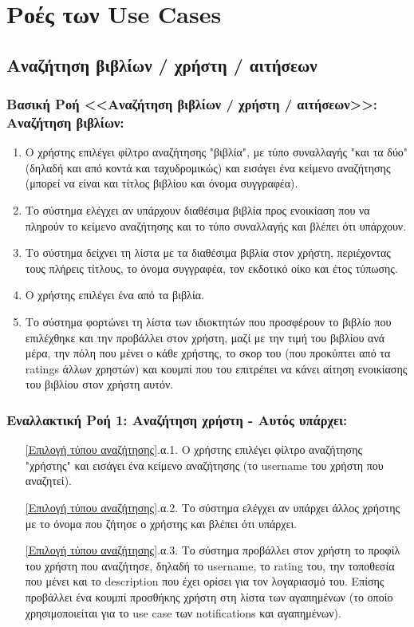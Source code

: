 \documentclass[12pt,a4paper]{article}
\begin{document}
\section{Ροές των Use Cases}
\label{Ροές των Use Cases}

\subsection{Αναζήτηση βιβλίων / χρήστη / αιτήσεων}

\subsubsection*{Βασική Ροή <<Αναζήτηση βιβλίων / χρήστη / αιτήσεων>>: Αναζήτηση βιβλίων:}
\begin{enumerate}
    \item Ο χρήστης επιλέγει φίλτρο αναζήτησης "βιβλία", με τύπο συναλλαγής "και τα δύο" (δηλαδή και από κοντά και ταχυδρομικώς) και εισάγει ένα κείμενο αναζήτησης (μπορεί να είναι και τίτλος βιβλίου και όνομα συγγραφέα).
        \label{Επιλογή τύπου αναζήτησης}
    \item Το σύστημα ελέγχει αν υπάρχουν διαθέσιμα βιβλία προς ενοικίαση που να πληρούν το κείμενο αναζήτησης και το τύπο συναλλαγής και βλέπει ότι υπάρχουν.
        \label{Ύπαρξη βιβλίου}
    \item Το σύστημα δείχνει τη λίστα με τα διαθέσιμα βιβλία στον χρήστη, περιέχοντας τους πλήρεις τίτλους, το όνομα συγγραφέα, τον εκδοτικό οίκο και έτος τύπωσης.
    \item Ο χρήστης επιλέγει ένα από τα βιβλία.
    \item Το σύστημα φορτώνει τη λίστα των ιδιοκτητών που προσφέρουν το βιβλίο που επιλέχθηκε και την προβάλλει στον χρήστη, μαζί με την τιμή του βιβλίου ανά μέρα, την πόλη που μένει ο κάθε χρήστης, το σκορ του (που προκύπτει από τα ratings άλλων χρηστών) και κουμπί που του επιτρέπει να κάνει αίτηση ενοικίασης του βιβλίου στον χρήστη αυτόν.
\end{enumerate}

\subsubsection*{Εναλλακτική Ροή 1: Αναζήτηση χρήστη - Αυτός υπάρχει:}
\begin{enumerate}
    \item[\ref{Επιλογή τύπου αναζήτησης}.α.1.] Ο χρήστης επιλέγει φίλτρο αναζήτησης "χρήστης" και εισάγει ένα κείμενο αναζήτησης (το username του χρήστη που αναζητεί).
    \item[\ref{Επιλογή τύπου αναζήτησης}.α.2.] Το σύστημα ελέγχει αν υπάρχει άλλος χρήστης με το όνομα που ζήτησε ο χρήστης και βλέπει ότι υπάρχει.
    \item[\ref{Επιλογή τύπου αναζήτησης}.α.3.] Το σύστημα προβάλλει στον χρήστη το προφίλ του χρήστη που αναζήτησε, δηλαδή το username, το rating του, την τοποθεσία που μένει και το description που έχει ορίσει για τον λογαριασμό του. Επίσης προβάλλει ένα κουμπί προσθήκης χρήστη στη λίστα των αγαπημένων (το οποίο χρησιμοποιείται για το use case των notifications και αγαπημένων).
\end{enumerate}
\end{document}
